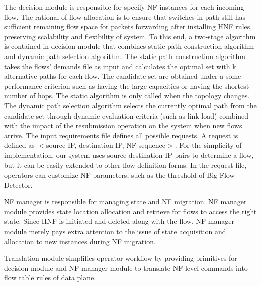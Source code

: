 \documentclass[10pt, conference, letterpaper]{IEEEtran}
\begin{document}
The decision module is responsible for specify NF instances for each incoming flow. The rational of flow allocation is to ensure that switches in path still has sufficient remaining flow space for packets forwarding after installing HNF rules, preserving scalability and flexibility of system. To this end, a two-stage algorithm is contained in decision module that combines static path construction algorithm and dynamic path selection algorithm.
The static path construction algorithm takes the flows' demands  file as input and calculates the optimal set with k alternative paths for each flow. The candidate set are obtained under a some performance criterion such as having the large capacities or having the shortest number of hops. The static algorithm is only called when the topology changes.
 The dynamic path selection algorithm selects the currently optimal path from the candidate set through dynamic evaluation criteria (such as link load) combined with the impact of the resubmission operation on the system when new flows arrive. 
 The input requirements file defines all possible requests. A request is defined as $<$source IP, destination IP, NF sequence$>$. For the simplicity of implementation, our system uses source-destination IP pairs to determine a flow, but it can be easily extended to other flow definition forms. In the request file, operators can customize NF parameters, such as the threshold of Big Flow Detector.

NF manager is responsible for managing state and NF migration. NF manager module provides state location allocation and retrieve for flows to access the right state. Since HNF is  initiated and deleted along with the flow, NF manager module merely pays extra attention to the issue of state acquisition and allocation to new instances during NF migration.

Translation module simplifies operator workflow by providing primitives for decision module and NF manager module to translate NF-level commands into flow table rules of data plane.
\end{document}
